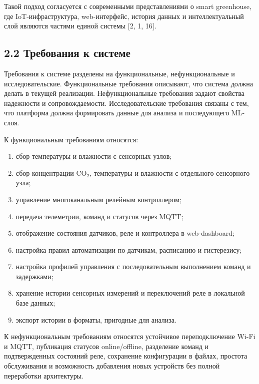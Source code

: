 \documentclass[a4paper,14pt]{extarticle}
\providecommand{\tightlist}{%
  \setlength{\itemsep}{0pt}\setlength{\parskip}{0pt}}
\begin{document}
Такой подход согласуется с современными представлениями о smart
greenhouse, где IoT-инфраструктура, web-интерфейс, история данных и
интеллектуальный слой являются частями единой системы {[}2, 1, 16{]}.

\hypertarget{ux442ux440ux435ux431ux43eux432ux430ux43dux438ux44f-ux43a-ux441ux438ux441ux442ux435ux43cux435}{%
\subsection{2.2 Требования к
системе}\label{ux442ux440ux435ux431ux43eux432ux430ux43dux438ux44f-ux43a-ux441ux438ux441ux442ux435ux43cux435}}

Требования к системе разделены на функциональные, нефункциональные и
исследовательские. Функциональные требования описывают, что система
должна делать в текущей реализации. Нефункциональные требования задают
свойства надежности и сопровождаемости. Исследовательские требования
связаны с тем, что платформа должна формировать данные для анализа и
последующего ML-слоя.

К функциональным требованиям относятся:

\begin{enumerate}
\def\labelenumi{\arabic{enumi})}
\tightlist
\item
  сбор температуры и влажности с сенсорных узлов;
\item
  сбор концентрации CO\(_2\), температуры и влажности с отдельного
  сенсорного узла;
\item
  управление многоканальным релейным контроллером;
\item
  передача телеметрии, команд и статусов через MQTT;
\item
  отображение состояния датчиков, реле и контроллера в web-dashboard;
\item
  настройка правил автоматизации по датчикам, расписанию и гистерезису;
\item
  настройка профилей управления с последовательным выполнением команд и
  задержками;
\item
  хранение истории сенсорных измерений и переключений реле в локальной
  базе данных;
\item
  экспорт истории в форматы, пригодные для анализа.
\end{enumerate}

К нефункциональным требованиям относятся устойчивое переподключение
Wi-Fi и MQTT, публикация статусов online/offline, разделение команд и
подтвержденных состояний реле, сохранение конфигурации в файлах,
простота обслуживания и возможность добавления новых устройств без
полной переработки архитектуры.
\end{document}
